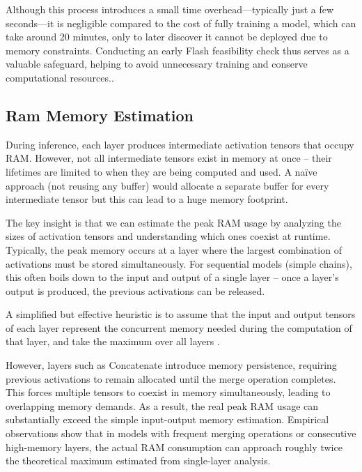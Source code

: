 Although this process introduces a small time overhead—typically just a few seconds—it is negligible compared to the cost of fully training a model, which can take around 20 minutes, only to later discover it cannot be deployed due to memory constraints. Conducting an early Flash feasibility check thus serves as a valuable safeguard, helping to avoid unnecessary training and conserve computational resources..

\clearpage

\subsection{Ram Memory Estimation}
During inference, each layer produces intermediate activation tensors that occupy RAM. However, not all intermediate tensors exist in memory at once – their lifetimes are limited to when they are being computed and used. A naïve approach (not reusing any buffer) would allocate a separate buffer for every intermediate tensor but this can lead to a huge memory footprint. \cite{tensorflow_RamEstimation} 


The key insight is that we can estimate the peak RAM usage by analyzing the sizes of activation tensors and understanding which ones coexist at runtime. Typically, the peak memory occurs at a layer where the largest combination of activations must be stored simultaneously. For sequential models (simple chains), this often boils down to the input and output of a single layer – once a layer’s output is produced, the previous activations can be released. \cite{liberis2019neural}

 A simplified but effective heuristic is to assume that the input and output tensors of each layer represent the concurrent memory needed during the computation of that layer, and take the maximum over all layers \cite{tensorflow_RamEstimation}. 

However, layers such as Concatenate introduce memory persistence, requiring previous activations to remain allocated until the merge operation completes. This forces multiple tensors to coexist in memory simultaneously, leading to overlapping memory demands. As a result, the real peak RAM usage can substantially exceed the simple input-output memory estimation. Empirical observations show that in models with frequent merging operations or consecutive high-memory layers, the actual RAM consumption can approach roughly twice the theoretical maximum estimated from single-layer analysis.

